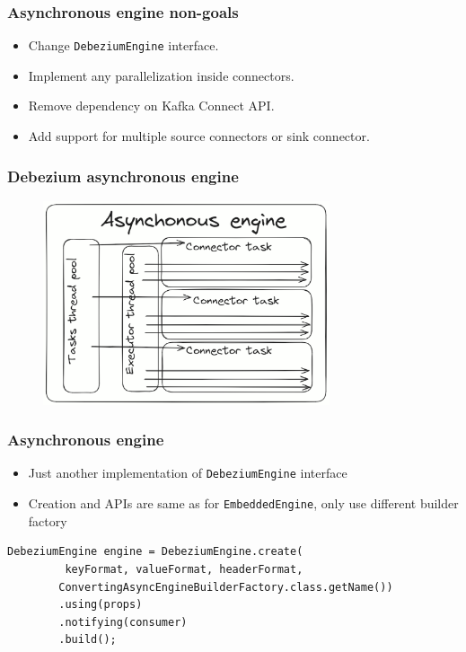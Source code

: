 \documentclass[10pt,utf8]{beamer}
\begin{document}
\begin{frame}
    \frametitle{Asynchronous engine non-goals}
    \begin{itemize}
        \item Change \texttt{DebeziumEngine} interface.
        \item Implement any parallelization inside connectors.
        \item Remove dependency on Kafka Connect API.
        \item Add support for multiple source connectors or sink connector.
    \end{itemize}
\end{frame}

\begin{frame}
    \frametitle{Debezium asynchronous engine}
    \begin{figure}
        \centering
        \includegraphics[height=6cm]{./img/async_engine.eps}
    \end{figure}
\end{frame}

\begin{frame}[fragile]
    \frametitle{Asynchronous engine}
    \begin{itemize}
      \item Just another implementation of \texttt{DebeziumEngine} interface
      \item Creation and APIs are same as for \texttt{EmbeddedEngine}, only use different builder factory
    \end{itemize}

    \begin{lstlisting}[style=java]
 DebeziumEngine engine = DebeziumEngine.create(
         keyFormat, valueFormat, headerFormat,
        ConvertingAsyncEngineBuilderFactory.class.getName())
        .using(props)
        .notifying(consumer)
        .build();
    \end{lstlisting}
\end{frame}
\end{document}
